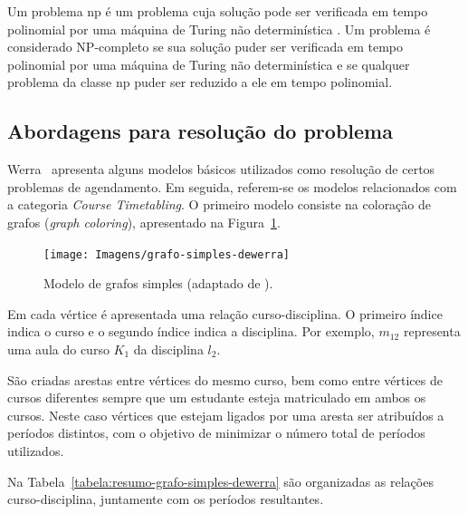 Um problema \gls{np} é um problema cuja solução pode ser verificada em tempo polinomial por uma máquina de Turing não determinística \cite{designanalysiscomputer-Aho-2000}. Um problema é considerado NP-completo se sua solução puder ser verificada em tempo polinomial por uma máquina de Turing não determinística e se qualquer problema da classe \gls{np} puder ser reduzido a ele em tempo polinomial.

\subsection{Abordagens para resolução do problema}

Werra~\cite{introductiontimetabling-Werra-1985} apresenta alguns modelos básicos utilizados como resolução de certos problemas de agendamento. Em seguida, referem-se os modelos relacionados com a categoria \textit{Course Timetabling}. O primeiro modelo consiste na coloração de grafos (\textit{graph coloring}), apresentado na Figura~\ref{fig:grafo-simples-dewerra}.

\begin{figure}[H]
    \centering
    \texttt{[image: Imagens/grafo-simples-dewerra]}
    \caption{Modelo de grafos simples (adaptado de \cite{introductiontimetabling-Werra-1985}).}
    \label{fig:grafo-simples-dewerra}
\end{figure}

Em cada vértice é apresentada uma relação curso-disciplina. O primeiro índice indica o curso e o segundo índice indica a disciplina. Por exemplo, $m_{12}$ representa uma aula do curso $K_{1}$ da disciplina $l_{2}$.

São criadas arestas entre vértices do mesmo curso, bem como entre vértices de cursos diferentes sempre que um estudante esteja matriculado em ambos os cursos. Neste caso vértices que estejam ligados por uma aresta ser atribuídos a períodos distintos, com o objetivo de minimizar o número total de períodos utilizados.

Na Tabela~\ref{tabela:resumo-grafo-simples-dewerra} são organizadas as relações curso-disciplina, juntamente com os períodos resultantes.


